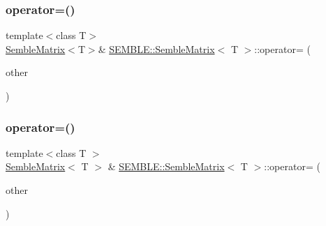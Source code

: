 \mbox{\label{structSEMBLE_1_1SembleMatrix_a74e1c17cd1508165df588807c3ee5ce8}} 
\subsubsection{\texorpdfstring{operator=()}{operator=()}\hspace{0.1cm}{\footnotesize\ttfamily [2/4]}}
{\footnotesize\ttfamily template$<$class T$>$ \\
\mbox{\hyperlink{structSEMBLE_1_1SembleMatrix}{Semble\+Matrix}}$<$T$>$\& \mbox{\hyperlink{structSEMBLE_1_1SembleMatrix}{S\+E\+M\+B\+L\+E\+::\+Semble\+Matrix}}$<$ T $>$\+::operator= (\begin{DoxyParamCaption}\item[{const \mbox{\hyperlink{structSEMBLE_1_1SembleMatrix}{Semble\+Matrix}}$<$ T $>$ \&}]{other }\end{DoxyParamCaption})}

\mbox{\label{structSEMBLE_1_1SembleMatrix_a8f29a7755be1f2cad035c0fcafc522f5}} 
\subsubsection{\texorpdfstring{operator=()}{operator=()}\hspace{0.1cm}{\footnotesize\ttfamily [3/4]}}
{\footnotesize\ttfamily template$<$class T $>$ \\
\mbox{\hyperlink{structSEMBLE_1_1SembleMatrix}{Semble\+Matrix}}$<$ T $>$ \& \mbox{\hyperlink{structSEMBLE_1_1SembleMatrix}{S\+E\+M\+B\+L\+E\+::\+Semble\+Matrix}}$<$ T $>$\+::operator= (\begin{DoxyParamCaption}\item[{const itpp\+::\+Mat$<$ T $>$ \&}]{other }\end{DoxyParamCaption})}

\mbox{\label{structSEMBLE_1_1SembleMatrix_aa8b242b6d0156b1cbaaa65dfa60f343b}} 
